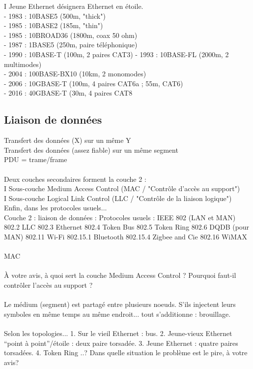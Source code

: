 \documentclass[5pt]{article}
\begin{document}
\begin{scriptsize}
I Jeune Ethernet désignera Ethernet en étoile.\\
- 1983 : 10BASE5 (500m, "thick")\\
- 1985 : 10BASE2 (185m, "thin")\\
- 1985 : 10BROAD36 (1800m, coax 50 ohm)\\
- 1987 : 1BASE5 (250m, paire téléphonique)\\
- 1990 : 10BASE-T (100m, 2 paires CAT3) - 1993 : 10BASE-FL (2000m, 2 multimodes)\\
- 2004 : 100BASE-BX10 (10km, 2 monomodes)\\
- 2006 : 10GBASE-T (100m, 4 paires CAT6a ; 55m, CAT6)\\
- 2016 : 40GBASE-T (30m, 4 paires CAT8\\
\subsection{Liaison de données}
Transfert des données (X) sur un même Y\\
Transfert des données (assez fiable) sur un même segment \\
PDU = trame/frame\\
\\
Deux couches secondaires forment la couche 2 :\\
I Sous-couche Medium Access Control (MAC / "Contrôle d’accès au support")\\
I Sous-couche Logical Link Control (LLC / "Contrôle de la liaison logique")\\
Enfin, dans les protocoles usuels...\\
Couche 2 : liaison de données : Protocoles usuels : IEEE 802 (LAN et MAN)\\
802.2 LLC 802.3 Ethernet 802.4 Token Bus 802.5 Token Ring 802.6 DQDB (pour MAN) 802.11 Wi-Fi 802.15.1 Bluetooth 802.15.4 Zigbee and Cie 802.16 WiMAX\\
\\
MAC\\
\\
À votre avis, à quoi sert la couche Medium Access Control ? Pourquoi faut-il contrôler l’accès au support ?\\
\\
Le médium (segment) est partagé entre plusieurs noeuds. S’ils injectent leurs symboles en même temps au même endroit... tout s’additionne : brouillage.\\
\\
Selon les topologies... 1. Sur le vieil Ethernet : bus. 2. Jeune-vieux Ethernet “point à point”/étoile : deux paire torsadée. 3. Jeune Ethernet : quatre paires torsadées. 4. Token Ring ..? Dans quelle situation le problème est le pire, à votre avis?\\

\end{scriptsize}
\end{document}
